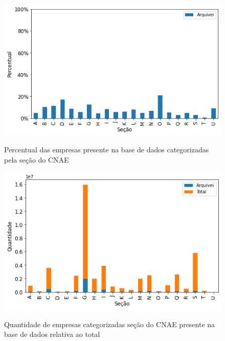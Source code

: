 \begin{figure}[htb]
    \centering
    \caption{Percentual das empresas presente na base de dados categorizadas pela seção do CNAE}
    \includegraphics[scale=0.7]{images/base-de-dados-7.1-presenca-por-secao.png}
    \label{fig:base-de-dados:descritiva-7.1-presenca-por-secao}
    \fautor
\end{figure}

\begin{figure}[htb]
    \centering
    \caption{Quantidade de empresas categorizadas seção do CNAE presente na base de dados relativa ao total}
    \includegraphics[scale=0.7]{images/base-de-dados-7.2-qtde-por-secao.png}
    \label{fig:base-de-dados:descritiva-7.2-qtde-por-secao}
    \fautor
\end{figure}

